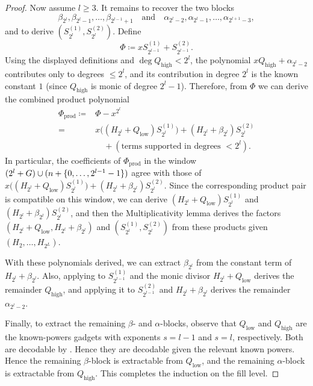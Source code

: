 \begin{proof}
    Now assume $l\ge 3$.
    It remains to recover the two blocks
    \[
      \beta_{2^l},\beta_{2^l-1},\ldots,\beta_{2^{l-1}+1}
      \quad\text{and}\quad
      \alpha_{2^l-2},\alpha_{2^l-1},\ldots,\alpha_{2^{l+1}-3},
    \]
    and to derive $(S^{(1)}_{2^l},S^{(2)}_{2^l})$.
    Define
    \[
      \Phi\coloneqq xS^{(1)}_{2^{l-1}}+S^{(2)}_{2^{l-1}}.
    \]
    Using the displayed definitions and $\deg Q_{\mathrm{high}}<2^l$, the polynomial $xQ_{\mathrm{high}}+\alpha_{2^l-2}$ contributes only to degrees $\le 2^l$, and its contribution in degree $2^l$ is the known constant $1$ (since $Q_{\mathrm{high}}$ is monic of degree $2^l-1$).
    Therefore, from $\Phi$ we can derive the combined product polynomial
    \[
      \begin{aligned}
      \Phi_{\mathrm{prod}}\coloneqq{}&\Phi-x^{2^l}\\
        ={}&x\bigl((H_{2^l}+Q_{\mathrm{low}})S^{(1)}_{2^l}\bigr)
           +(H_{2^l}+\beta_{2^l})S^{(2)}_{2^l}\\
        &\quad +(\text{terms supported in degrees }<2^l).
      \end{aligned}
    \]
    In particular, the coefficients of $\Phi_{\mathrm{prod}}$ in the window $(2^l+G)\cup(n+\{0,\dotsc,2^{l-1}-1\})$ agree with those of
    \(x\bigl((H_{2^l}+Q_{\mathrm{low}})S^{(1)}_{2^l}\bigr) + (H_{2^l}+\beta_{2^l})S^{(2)}_{2^l}\).
    Since the corresponding product pair is compatible on this window, we can derive
    \(
      (H_{2^l}+Q_{\mathrm{low}})S^{(1)}_{2^l}
    \)
    and
    \(
      (H_{2^l}+\beta_{2^l})S^{(2)}_{2^l}
    \),
    and then the Multiplicativity lemma derives the factors $(H_{2^l}+Q_{\mathrm{low}},H_{2^l}+\beta_{2^l})$ and $(S^{(1)}_{2^l},S^{(2)}_{2^l})$ from these products given $(H_2,\ldots,H_{2^L})$.

    With these polynomials derived, we can extract $\beta_{2^l}$ from the constant term of $H_{2^l}+\beta_{2^l}$.
    Also, applying  to $S^{(1)}_{2^{l-1}}$ and the monic divisor $H_{2^l}+Q_{\mathrm{low}}$ derives the remainder $Q_{\mathrm{high}}$, and applying it to $S^{(2)}_{2^{l-1}}$ and $H_{2^l}+\beta_{2^l}$ derives the remainder $\alpha_{2^l-2}$.

    Finally, to extract the remaining $\beta$- and $\alpha$-blocks, observe that $Q_{\mathrm{low}}$ and $Q_{\mathrm{high}}$ are the known-powers gadgets with exponents $s=l-1$ and $s=l$, respectively.  Both are decodable by .  Hence they are decodable given the relevant known powers.
    Hence the remaining $\beta$-block is extractable from $Q_{\mathrm{low}}$, and the remaining $\alpha$-block is extractable from $Q_{\mathrm{high}}$.
    This completes the induction on the fill level.
\end{proof}

